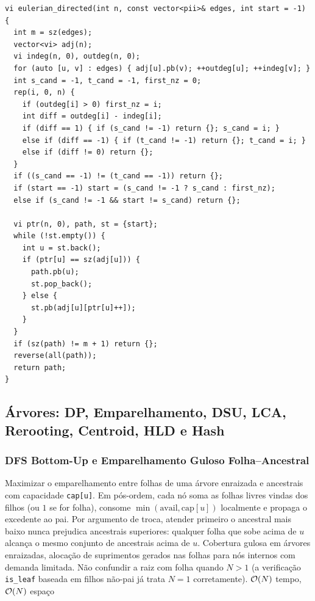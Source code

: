 \begin{lstlisting}
vi eulerian_directed(int n, const vector<pii>& edges, int start = -1) {
  int m = sz(edges);
  vector<vi> adj(n);
  vi indeg(n, 0), outdeg(n, 0);
  for (auto [u, v] : edges) { adj[u].pb(v); ++outdeg[u]; ++indeg[v]; }
  int s_cand = -1, t_cand = -1, first_nz = 0;
  rep(i, 0, n) {
    if (outdeg[i] > 0) first_nz = i;
    int diff = outdeg[i] - indeg[i];
    if (diff == 1) { if (s_cand != -1) return {}; s_cand = i; }
    else if (diff == -1) { if (t_cand != -1) return {}; t_cand = i; }
    else if (diff != 0) return {};
  }
  if ((s_cand == -1) != (t_cand == -1)) return {};
  if (start == -1) start = (s_cand != -1 ? s_cand : first_nz);
  else if (s_cand != -1 && start != s_cand) return {};

  vi ptr(n, 0), path, st = {start};
  while (!st.empty()) {
    int u = st.back();
    if (ptr[u] == sz(adj[u])) {
      path.pb(u);
      st.pop_back();
    } else {
      st.pb(adj[u][ptr[u]++]);
    }
  }
  if (sz(path) != m + 1) return {};
  reverse(all(path));
  return path;
}
\end{lstlisting}

\subsection{Árvores: DP, Emparelhamento, DSU, LCA, Rerooting, Centroid, HLD e Hash}

\subsubsection{DFS Bottom-Up e Emparelhamento Guloso Folha--Ancestral}
\algobox
  {Maximizar o emparelhamento entre folhas de uma árvore enraizada e ancestrais com capacidade \texttt{cap[u]}.}
  {Em pós-ordem, cada nó soma as folhas livres vindas dos filhos (ou $1$ se for folha), consome $\min(\text{avail}, \text{cap}[u])$ localmente e propaga o excedente ao pai.}
  {Por argumento de troca, atender primeiro o ancestral mais baixo nunca prejudica ancestrais superiores: qualquer folha que sobe acima de $u$ alcança o mesmo conjunto de ancestrais acima de $u$.}
  {Cobertura gulosa em árvores enraizadas, alocação de suprimentos gerados nas folhas para nós internos com demanda limitada.}
  {Não confundir a raiz com folha quando $N > 1$ (a verificação \texttt{is\_leaf} baseada em filhos não-pai já trata $N = 1$ corretamente).}
  {$\mathcal{O}(N)$ tempo, $\mathcal{O}(N)$ espaço}

